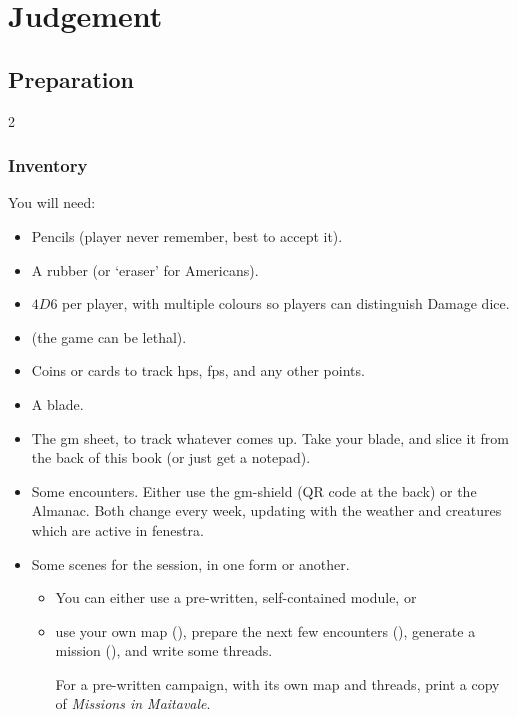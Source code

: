 \chapter[Bastion of Judgement]{Judgement}
\label{judgement}

\section{Preparation}

\begin{multicols}{2}

\subsection{Inventory}

You will need:

\begin{itemize}
  \item
  Pencils (player never remember, best to accept it).
  \item
  A rubber (or `eraser' for Americans).
  \item
  $4D6$ per player, with multiple colours so players can distinguish Damage dice.
  \item
  \iftoggle{stories}{
    A boat-load of character sheets
  }{
    Some pre-made characters, including spares
  } (the game can be lethal).
  \item
  Coins or cards to track \glspl{hp}, \glspl{fp}, and any other points.
  \item
  A blade.
  \item
  The \gls{gm} sheet, to track whatever comes up.
  Take your blade, and slice it from the back of this book (or just get a notepad).
  \item
  Some encounters.
  Either use the \gls{gm}-shield (QR code at the back) or the Almanac.
  Both change every week, updating with the weather and creatures which are active in \gls{fenestra}.
  \item
  Some scenes for the session, in one form or another.
  \begin{itemize}
    \item
    You can either use a pre-written, self-contained module, or
    \item
    use your own map (),
    prepare the next few encounters (),
    generate a mission (),
    and write some \glspl{thread}.

    For a pre-written \gls{campaign}, with its own map and \glspl{thread}, print a copy of \textit{Missions in Maitavale}.
  \end{itemize}
\end{itemize}


\end{multicols}
